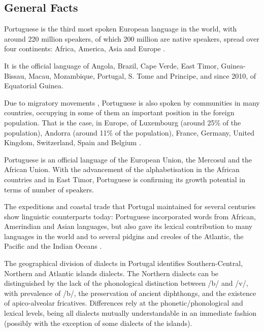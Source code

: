 \begin{multicols}{2}

\subsection{General Facts}

Portuguese is the third most spoken European language in the world, with around 220 million speakers, of which  200 million are native speakers, spread over four continents: Africa, America, Asia and Europe \cite{observatorio} \cite{ethnologue}. 

   It is the official language of Angola, Brazil, Cape Verde, East Timor, Guinea-Bissau, Macau, Mozambique, Portugal, S. Tome and Principe, and since 2010, of Equatorial Guinea. 


   Due to migratory movements \cite{stat1} \cite{obsemig}, Portuguese is also spoken by communities in many countries, occupying in some of them an important position in the foreign population. That is the case, in Europe, of Luxembourg (around 25\% of the population), Andorra (around 11\% of the population), France, Germany, United Kingdom, Switzerland, Spain and Belgium \cite{linha}.

 Portuguese is an official language of the European Union, the Mercosul and the African Union. With the advancement of the alphabetisation 
in the African countries and in East Timor, Portuguese is confirming its growth potential in terms of number of speakers.

The expeditions and coastal trade that Portugal maintained for several centuries show linguistic counterparts today: Portuguese incorporated words from African, Amerindian and Asian languages, but also gave its lexical contribution to many languages in the world and to several pidgins and creoles of the Atlantic, the Pacific and the Indian Oceans \cite{andrade}  \cite{camoes}.

   The geographical division of dialects in Portugal \cite{cintra} identifies Southern-Central, Northern and Atlantic islands dialects. The Northern dialects can be distinguished by the lack of the phonological distinction between /b/ and /v/, with prevalence of /b/, the preservation of ancient diphthongs, and the existence of apico-alveolar fricatives. Differences rely at the phonetic/phonological and lexical levels, being all dialects mutually understandable in an immediate fashion (possibly with the exception of some dialects of the islands).


\end{multicols}
